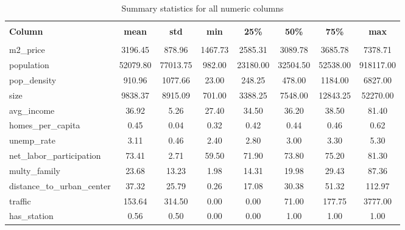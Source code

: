 
    \begin{table}
      \centering 
      \caption{Summary statistics for all numeric columns} 
      \vspace{10pt}
      \label{tab:summary_statistics} 
      \begin{tabular}{@{\extracolsep{5pt}} lccccccc} 
      \hline 
      \hline \\[-1.8ex] 
      \textbf{Column} & \textbf{mean} & \textbf{std} & \textbf{min} & \textbf{25\%} & \textbf{50\%} & \textbf{75\%} & \textbf{max} \\ 
      \hline \\[-1.8ex] 
    m2\_price & 3196.45 & 878.96 & 1467.73 & 2585.31 & 3089.78 & 3685.78 & 7378.71 \\ 
population & 52079.80 & 77013.75 & 982.00 & 23180.00 & 32504.50 & 52538.00 & 918117.00 \\ 
pop\_density & 910.96 & 1077.66 & 23.00 & 248.25 & 478.00 & 1184.00 & 6827.00 \\ 
size & 9838.37 & 8915.09 & 701.00 & 3388.25 & 7548.00 & 12843.25 & 52270.00 \\ 
avg\_income & 36.92 & 5.26 & 27.40 & 34.50 & 36.20 & 38.50 & 81.40 \\ 
homes\_per\_capita & 0.45 & 0.04 & 0.32 & 0.42 & 0.44 & 0.46 & 0.62 \\ 
unemp\_rate & 3.11 & 0.46 & 2.40 & 2.80 & 3.00 & 3.30 & 5.30 \\ 
net\_labor\_participation & 73.41 & 2.71 & 59.50 & 71.90 & 73.80 & 75.20 & 81.30 \\ 
multy\_family & 23.68 & 13.23 & 1.98 & 14.31 & 19.98 & 29.43 & 87.36 \\ 
distance\_to\_urban\_center & 37.32 & 25.79 & 0.26 & 17.08 & 30.38 & 51.32 & 112.97 \\ 
traffic & 153.64 & 314.50 & 0.00 & 0.00 & 71.00 & 177.75 & 3777.00 \\ 
has\_station & 0.56 & 0.50 & 0.00 & 0.00 & 1.00 & 1.00 & 1.00 \\ 

      \hline 
      \hline 
      \end{tabular} 
    \end{table} 
    